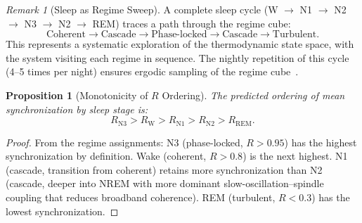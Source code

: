 \documentclass[aps,prd,twocolumn,superscriptaddress,floatfix,nofootinbib]{revtex4-2}
\newtheorem{proposition}[theorem]{Proposition}
\theoremstyle{remark}
\newtheorem{remark}[theorem]{Remark}
\newcommand{\Rorder}{R}
\begin{document}
\begin{remark}[Sleep as Regime Sweep]
A complete sleep cycle (W $\to$ N1 $\to$ N2 $\to$ N3 $\to$ N2 $\to$ REM) traces a path through the regime cube:
\begin{equation}
    \text{Coherent} \to \text{Cascade} \to \text{Phase-locked} \to \text{Cascade} \to \text{Turbulent}.
\end{equation}
This represents a systematic exploration of the thermodynamic state space, with the system visiting each regime in sequence. The nightly repetition of this cycle (4--5 times per night) ensures ergodic sampling of the regime cube~\cite{diekelmann2010memory}.
\end{remark}

\begin{proposition}[Monotonicity of $\Rorder$ Ordering]
\label{prop:ordering}
The predicted ordering of mean synchronization by sleep stage is:
\begin{equation}
    \Rorder_{\text{N3}} > \Rorder_{\text{W}} > \Rorder_{\text{N1}} > \Rorder_{\text{N2}} > \Rorder_{\text{REM}}.
    \label{eq:ordering}
\end{equation}
\end{proposition}

\begin{proof}
From the regime assignments: N3 (phase-locked, $\Rorder > 0.95$) has the highest synchronization by definition. Wake (coherent, $\Rorder > 0.8$) is the next highest. N1 (cascade, transition from coherent) retains more synchronization than N2 (cascade, deeper into NREM with more dominant slow-oscillation--spindle coupling that reduces broadband coherence). REM (turbulent, $\Rorder < 0.3$) has the lowest synchronization.
\end{proof}
\end{document}
